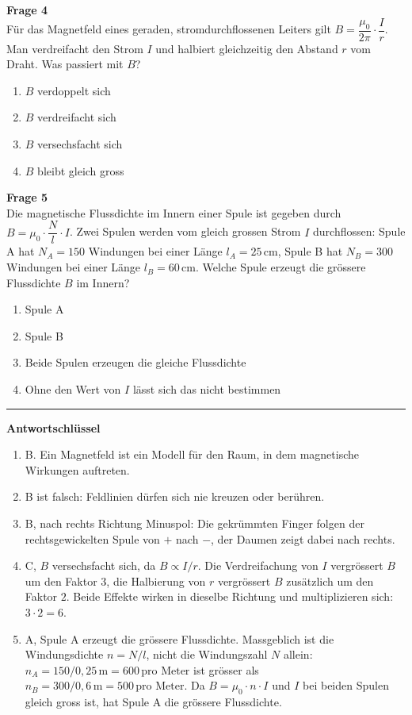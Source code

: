 \documentclass[11pt,a4paper]{article}
\begin{document}
\textbf{Frage 4}\\
Für das Magnetfeld eines geraden, stromdurchflossenen Leiters gilt
$B = \dfrac{\mu_0}{2\pi}\cdot\dfrac{I}{r}$. Man verdreifacht den Strom $I$
und halbiert gleichzeitig den Abstand $r$ vom Draht. Was passiert mit $B$?
\begin{enumerate}[label=\Alph*)]
  \item $B$ verdoppelt sich
  \item $B$ verdreifacht sich
  \item $B$ versechsfacht sich
  \item $B$ bleibt gleich gross
\end{enumerate}

\textbf{Frage 5}\\
Die magnetische Flussdichte im Innern einer Spule ist gegeben durch
$B = \mu_0\cdot\dfrac{N}{l}\cdot I$. Zwei Spulen werden vom gleich grossen
Strom $I$ durchflossen: Spule A hat $N_A = 150$ Windungen bei einer Länge
$l_A = 25\,\text{cm}$, Spule B hat $N_B = 300$ Windungen bei einer Länge
$l_B = 60\,\text{cm}$. Welche Spule erzeugt die grössere Flussdichte $B$
im Innern?
\begin{enumerate}[label=\Alph*)]
  \item Spule A
  \item Spule B
  \item Beide Spulen erzeugen die gleiche Flussdichte
  \item Ohne den Wert von $I$ lässt sich das nicht bestimmen
\end{enumerate}

\bigskip
\hrule
\bigskip

\textbf{Antwortschlüssel}
\begin{enumerate}
  \item B. Ein Magnetfeld ist ein Modell für den Raum, in dem magnetische
  Wirkungen auftreten.
  \item B ist falsch: Feldlinien dürfen sich nie kreuzen oder berühren.
  \item B, nach rechts Richtung Minuspol: Die gekrümmten Finger folgen der
  rechtsgewickelten Spule von $+$ nach $-$, der Daumen zeigt dabei nach
  rechts.
  \item C, $B$ versechsfacht sich, da $B \propto I/r$. Die Verdreifachung
  von $I$ vergrössert $B$ um den Faktor $3$, die Halbierung von $r$
  vergrössert $B$ zusätzlich um den Faktor $2$. Beide Effekte wirken in
  dieselbe Richtung und multiplizieren sich: $3 \cdot 2 = 6$.
  \item A, Spule A erzeugt die grössere Flussdichte. Massgeblich ist die
  Windungsdichte $n = N/l$, nicht die Windungszahl $N$ allein:
  $n_A = 150 / 0{,}25\,\text{m} = 600\,\text{pro Meter}$ ist grösser als
  $n_B = 300 / 0{,}6\,\text{m} = 500\,\text{pro Meter}$. Da $B = \mu_0\cdot
  n\cdot I$ und $I$ bei beiden Spulen gleich gross ist, hat Spule A die
  grössere Flussdichte.
\end{enumerate}
\end{document}
